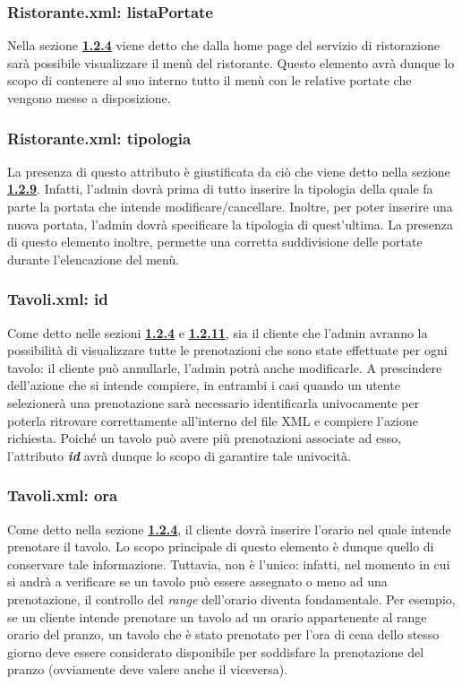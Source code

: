 \documentclass [a4paper, 12pt]{book}
\begin{document}
\subsubsection{Ristorante.xml: listaPortate}
Nella sezione \hyperref[ServizioRistorazione]{\textbf{1.2.4}} viene detto che dalla home page del servizio di ristorazione sarà possibile visualizzare il menù del ristorante. Questo elemento avrà dunque lo scopo di contenere al suo interno tutto il menù con le relative portate che vengono messe a disposizione.

\subsubsection{Ristorante.xml: tipologia}
La presenza di questo attributo è giustificata da ciò che viene detto nella sezione \hyperref[ModificaMenu]{\textbf{1.2.9}}. Infatti, l'admin dovrà prima di tutto inserire la tipologia della quale fa parte la portata che intende modificare/cancellare. Inoltre, per poter inserire una nuova portata, l'admin dovrà specificare la tipologia di quest'ultima. La presenza di questo elemento inoltre, permette una corretta suddivisione delle portate durante l'elencazione del menù.

\subsubsection{Tavoli.xml: id}
Come detto nelle sezioni \hyperref[ServizioRistorazione]{\textbf{1.2.4}} e \hyperref[VisualizzaPrenotazioniClienti]{\textbf{1.2.11}}, sia il cliente che l'admin avranno la possibilità di visualizzare tutte le prenotazioni che sono state effettuate per ogni tavolo: il cliente può annullarle, l'admin potrà anche modificarle. A prescindere dell'azione che si intende compiere, in entrambi i casi quando un utente selezionerà una prenotazione sarà necessario identificarla univocamente per poterla ritrovare correttamente all'interno del file XML e compiere l'azione richiesta. Poiché un tavolo può avere più prenotazioni associate ad esso, l'attributo \textbf{\textit{id}} avrà dunque lo scopo di garantire tale univocità.


\subsubsection{Tavoli.xml: ora}
Come detto nella sezione \hyperref[ServizioRistorazione]{\textbf{1.2.4}}, il cliente dovrà inserire l'orario nel quale intende prenotare il tavolo. Lo scopo principale di questo elemento è dunque quello di conservare tale informazione. Tuttavia, non è l'unico: infatti, nel momento in cui si andrà a verificare se un tavolo può essere assegnato o meno ad una prenotazione, il controllo del \textit{range} dell'orario diventa fondamentale. Per esempio, se un cliente intende prenotare un tavolo ad un orario appartenente al range orario del pranzo, un tavolo che è stato prenotato per l'ora di cena dello stesso giorno deve essere considerato disponibile per soddisfare la prenotazione del pranzo (ovviamente deve valere anche il viceversa).
\end{document}
